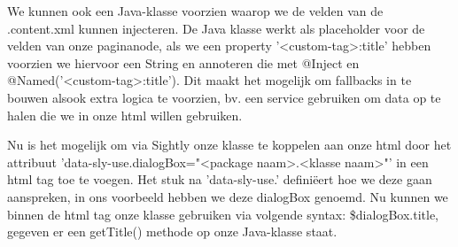 \documentclass{article}
\begin{document}
	\par
	We kunnen ook een Java-klasse voorzien waarop we de velden van de .content.xml kunnen injecteren. De Java klasse werkt als placeholder voor de velden van onze paginanode, als we een property '<custom-tag>:title' hebben voorzien we hiervoor een String en annoteren die met @Inject en @Named('<custom-tag>:title'). Dit maakt het mogelijk om fallbacks in te bouwen alsook extra logica te voorzien, bv. een service gebruiken om data op te halen die we in onze html willen gebruiken.  
	\par
	Nu is het mogelijk om via Sightly onze klasse te koppelen aan onze html door het attribuut 'data-sly-use.dialogBox="<package naam>.<klasse naam>"' in een html tag toe te voegen. Het stuk na 'data-sly-use.' definiëert hoe we deze gaan aanspreken, in ons voorbeeld hebben we deze dialogBox genoemd. Nu kunnen we binnen de html tag onze klasse gebruiken via volgende syntax: \${dialogBox.title}, gegeven er een getTitle() methode op onze Java-klasse staat.
\end{document}
